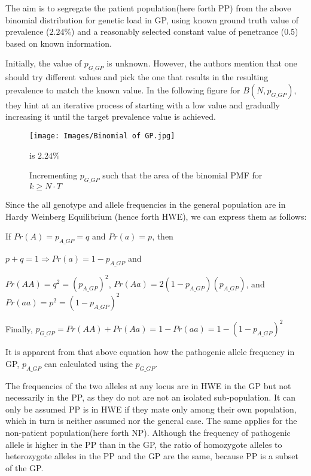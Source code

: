 \documentclass{article}
\begin{document}
The aim is to segregate the patient population(here forth PP) from the above binomial distribution for genetic load in GP, using known ground truth value of prevalence ($2.24\%$) and a reasonably selected constant value of penetrance (0.5) based on known information.
  
Initially, the value of $p_{G\_GP}$ is unknown. However, the authors mention that one should try different values and pick the one that results in the resulting prevalence to match the known value. In the following figure for $B(N, p_{G\_GP})$, they hint at an iterative process of starting with a low value and gradually increasing it until the target prevalence value is achieved.
  
\begin{figure}[htbp]
    \centering
    \texttt{[image: Images/Binomial of GP.jpg]}
    \caption{Incrementing $p_{G\_GP}$ such that the area of the binomial PMF for $k\geq N\cdot T$} is $2.24\%$
    \label{fig:my_label}
\end{figure}
  
Since the all genotype and allele frequencies in the general population are in Hardy Weinberg Equilibrium (hence forth HWE), we can express them as follows:
  
\begin{center}
If $Pr(A) = p_{A\_GP} = q$ and $Pr(a) = p$, then
\end{center} \begin{center}
$p + q = 1 \Longrightarrow Pr(a)=1-p_{A\_GP}$ and
\end{center} \begin{center}
$Pr(AA) = q^2 = (p_{A\_GP})^2$, $Pr(Aa) = 2(1-p_{A\_GP})(p_{A\_GP})$, and $Pr(aa)=p^2=(1-p_{A\_GP})^2$
\end{center} \begin{center}
Finally, $p_{G\_GP} =Pr(AA)+Pr(Aa) = 1 - Pr(aa) =  1-(1-p_{A\_GP})^2$
\end{center}
  
It is apparent from that above equation how the pathogenic allele frequency in GP, $p_{A\_GP}$ can calculated using the $p_{G\_GP}$.
  
The frequencies of the two alleles at any locus are in HWE in the GP but not necessarily in the PP, as they do not are not an isolated sub-population. It can only be assumed PP is in HWE if they mate only among their own population, which in turn is neither assumed nor the general case. The same applies for the non-patient population(here forth NP). Although the frequency of pathogenic allele is higher in the PP than in the GP, the ratio of homozygote alleles to heterozygote alleles in the PP and the GP are the same, because PP is a subset of the GP.
  
\end{document}

